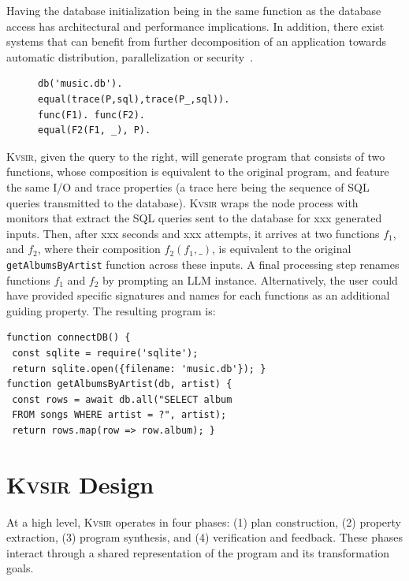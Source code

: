 \documentclass[noacm,sigplan]{acmart}
\newcommand{\sys}{{\scshape Kv{\textalpha}sir}\xspace}
\newcommand{\heading}[1]{\vspace{2pt}\noindent\textbf{\emph{#1}}:\enspace}
\newcommand{\ttt}[1]{\texttt{#1}\xspace}
\newcommand{\xxx}{\colorbox{red!30}{xxx}\xspace}
\begin{document}
Having the database initialization being in the same function as 
the database access has architectural and performance implications.
In addition, there exist systems that can benefit from further decomposition
of an application towards automatic distribution, parallelization or security~\cite{Towards_Modern_Ghemaw_2023, vasilakis2019ignis, vasilakis2018breakapp}.
\begin{figure}
  \vspace{-10pt}
  \begin{verbatim}
db('music.db').
equal(trace(P,sql),trace(P_,sql)).
func(F1). func(F2).
equal(F2(F1, _), P).
\end{verbatim}
\end{figure}
\sys, given the query to the right, will 
generate program that consists of two functions,
whose composition is equivalent to the original program, and feature 
the same I/O and trace properties (a trace here being the sequence of SQL 
queries transmitted to the database).
\sys wraps the node process with monitors that extract the SQL queries 
sent to the database for \xxx generated inputs.
Then, after \xxx seconds and \xxx attempts, it arrives at two functions $f_1$, and 
$f_2$, where their composition $f_2(f_1, \_)$, is equivalent to the original \ttt{getAlbumsByArtist} function across these inputs.
A final processing step renames functions $f_1$ and $f_2$ by prompting an LLM instance.
Alternatively, the user could have provided specific signatures and names for each 
functions as an additional guiding property.
The resulting program is:
\begin{verbatim}
function connectDB() {
 const sqlite = require('sqlite');
 return sqlite.open({filename: 'music.db'}); }
function getAlbumsByArtist(db, artist) {
 const rows = await db.all("SELECT album
 FROM songs WHERE artist = ?", artist);
 return rows.map(row => row.album); }
\end{verbatim}


\section{\sys Design}
\label{sec:design}

At a high level, \sys operates in four phases: (1) plan construction, (2)
property extraction, (3) program synthesis, and (4) verification and feedback.
These phases interact through a shared representation of the program and its
transformation goals.
\end{document}
